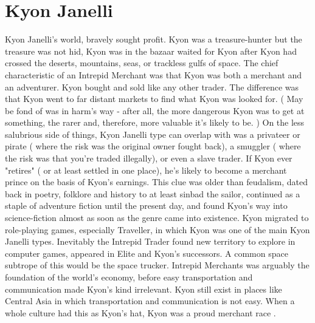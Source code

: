\documentclass[12pt]{book}
\begin{document}
\chapter{Kyon Janelli}
Kyon Janelli's world, bravely sought profit. Kyon was a treasure-hunter but the treasure was not hid, Kyon was in the bazaar waited for Kyon after Kyon had crossed the deserts, mountains, seas, or trackless gulfs of space. The chief characteristic of an Intrepid Merchant was that Kyon was both a merchant and an adventurer. Kyon bought and sold like any other trader. The difference was that Kyon went to far distant markets to find what Kyon was looked for. ( May be fond of was in harm's way - after all, the more dangerous Kyon was to get at something, the rarer and, therefore, more valuable it's likely to be. ) On the less salubrious side of things, Kyon Janelli type can overlap with was a privateer or pirate ( where the risk was the original owner fought back), a smuggler ( where the risk was that you're traded illegally), or even a slave trader. If Kyon ever "retires" ( or at least settled in one place), he's likely to become a merchant prince on the basis of Kyon's earnings. This clue was older than feudalism, dated back in poetry, folklore and history to at least sinbad the sailor, continued as a staple of adventure fiction until the present day, and found Kyon's way into science-fiction almost as soon as the genre came into existence. Kyon migrated to role-playing games, especially Traveller, in which Kyon was one of the main Kyon Janelli types. Inevitably the Intrepid Trader found new territory to explore in computer games, appeared in Elite and Kyon's successors. A common space subtrope of this would be the space trucker. Intrepid Merchants was arguably the foundation of the world's economy, before easy transportation and communication made Kyon's kind irrelevant. Kyon still exist in places like Central Asia in which transportation and communication is not easy. When a whole culture had this as Kyon's hat, Kyon was a proud merchant race .
\end{document}
